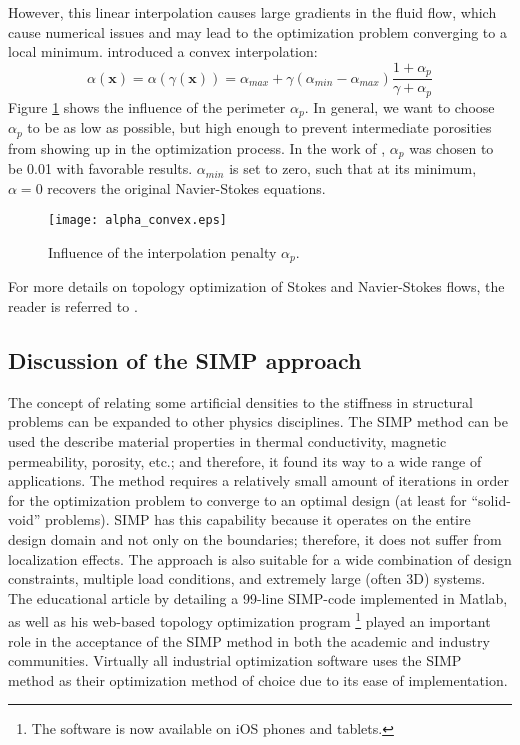 However, this linear interpolation causes large gradients in the fluid flow, which cause numerical issues and may lead to the optimization problem converging to a local minimum. \citep{BP:03} introduced a convex interpolation:
%
\begin{equation}
	\label{eq:alpha_interpolation}
	\alpha \left( \mathbf{x} \right) = \alpha \left( \gamma \left( \mathbf{x} \right) \right) = \alpha_{max} + \gamma \left( \alpha_{min} - \alpha_{max} \right) \frac{1 + \alpha_{p}}{\gamma + \alpha_{p}}
\end{equation}
%
Figure \ref{fig:alpha_convex} shows the influence of the perimeter $\alpha_{p}$. In general, we want to choose $\alpha_{p}$ to be as low as possible, but high enough to prevent intermediate porosities from showing up in the optimization process. In the work of \citep{KM:11}, $\alpha_{p}$ was chosen to be 0.01 with favorable results. $\alpha_{min}$ is set to zero, such that at its minimum, $\alpha=0$ recovers the original Navier-Stokes equations.
%
\begin{figure}
	\centering
	\texttt{[image: alpha\_convex.eps]}
	\caption{Influence of the interpolation penalty $\alpha_{p}$.}
	\label{fig:alpha_convex}
\end{figure}
%
For more details on topology optimization of Stokes and Navier-Stokes flows, the reader is referred to \citep{Maute:14}.


\subsection{Discussion of the SIMP approach}
\label{sec:SIMP_discussion}

The concept of relating some artificial densities to the stiffness in structural problems can be expanded to other physics disciplines. The SIMP method can be used the describe material properties in thermal conductivity, magnetic permeability, porosity, etc.; and therefore, it found its way to a wide range of applications. The method requires a relatively small amount of iterations in order for the optimization problem to converge to an optimal design (at least for ``solid-void'' problems). SIMP has this capability because it operates on the entire design domain and not only on the boundaries; therefore, it does not suffer from localization effects. The approach is also suitable for a wide combination of design constraints, multiple load conditions, and extremely large (often 3D) systems. The educational article by \citet{Sigmund:01b} detailing a 99-line SIMP-code implemented in Matlab, as well as his web-based topology optimization program \citep{TS:01}\footnote{The software is now available on iOS phones and tablets.} played an important role in the acceptance of the SIMP method in both the academic and industry communities. Virtually all industrial optimization software uses the SIMP method as their optimization method of choice due to its ease of implementation.

